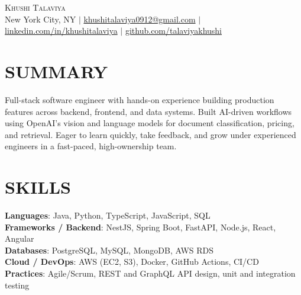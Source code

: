 \documentclass[letterpaper,11pt]{article}
\begin{document}
\begin{center}
    {\Huge \scshape Khushi Talaviya} \\ \vspace{2pt}
    \vspace{4pt}
    \small
    New York City, NY $|$
    \href{mailto:khushitalaviya0912@gmail.com}{khushitalaviya0912@gmail.com} $|$
    \href{https://www.linkedin.com/in/khushitalaviya/}{linkedin.com/in/khushitalaviya} $|$
    \href{https://github.com/talaviyakhushi}{github.com/talaviyakhushi}
\end{center}

\section{SUMMARY}
\vspace{5pt}
\small{Full-stack software engineer with hands-on experience building production features across backend, frontend, and data systems. Built AI-driven workflows using OpenAI's vision and language models for document classification, pricing, and retrieval. Eager to learn quickly, take feedback, and grow under experienced engineers in a fast-paced, high-ownership team.}

\vspace{2pt}
\section{SKILLS}
\vspace{5pt}
\begin{itemize}[leftmargin=0in, label={}]
\small{\item{
\textbf{Languages}{: Java, Python, TypeScript, JavaScript, SQL} \\
\textbf{Frameworks / Backend}{: NestJS, Spring Boot, FastAPI, Node.js, React, Angular} \\
\textbf{Databases}{: PostgreSQL, MySQL, MongoDB, AWS RDS} \\
\textbf{Cloud / DevOps}{: AWS (EC2, S3), Docker, GitHub Actions, CI/CD} \\
\textbf{Practices}{: Agile/Scrum, REST and GraphQL API design, unit and integration testing}
}}
\end{itemize}
\vspace{-10pt}

\end{document}
